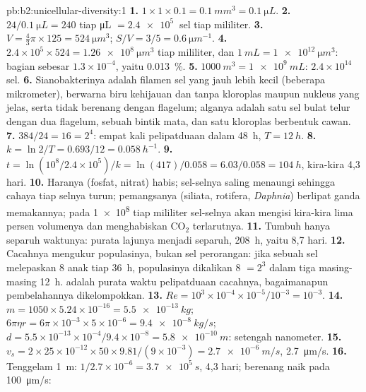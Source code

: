 \begin{solution}{pb:b2:unicellular-diversity:1}
\textbf{1.} $1\times 1\times 0.1 = \qty{0.1}{mm^3} = \qty{0.1}{\micro L}$.
\textbf{2.} $24/\qty{0.1}{\micro L} = 240$ tiap \unit{\micro L} $=
\qty{2.4e5}{}$ sel tiap mililiter.
\textbf{3.} $V = \tfrac{4}{3}\pi\times 125 = \qty{524}{\micro m^3}$;
$S/V = 3/5 = \qty{0.6}{\micro m^{-1}}$.
\textbf{4.} $2.4\times 10^5\times 524 = \qty{1.26e8}{\micro m^3}$ tiap
mililiter, dan $\qty{1}{mL} = \qty{1e12}{\micro m^3}$: bagian sebesar
$1.3\times 10^{-4}$, yaitu \qty{0.013}{\%}.
\textbf{5.} $\qty{1000}{m^3} = \qty{1e9}{mL}$: $2.4\times 10^{14}$
sel.
\textbf{6.} Sianobakterinya adalah filamen sel yang jauh lebih kecil
(beberapa mikrometer), berwarna biru kehijauan dan tanpa kloroplas
maupun nukleus yang jelas, serta tidak berenang dengan flagelum;
alganya adalah satu sel bulat telur dengan dua flagelum, sebuah bintik
mata, dan satu kloroplas berbentuk cawan.
\textbf{7.} $384/24 = 16 = 2^4$: empat kali pelipatduaan dalam
\qty{48}{h}, $T = \qty{12}{h}$.
\textbf{8.} $k = \ln 2/T = 0.693/12 = \qty{0.058}{h^{-1}}$.
\textbf{9.} $t = \ln(10^8/2.4\times 10^5)/k = \ln(417)/0.058 =
6.03/0.058 = \qty{104}{h}$, kira-kira 4,3 hari.
\textbf{10.} Haranya (fosfat, nitrat) habis; sel-selnya saling
menaungi sehingga cahaya tiap selnya turun; pemangsanya (siliata,
rotifera, \emph{Daphnia}) berlipat ganda memakannya; pada
\qty{1e8}{} tiap mililiter sel-selnya akan mengisi kira-kira lima
persen volumenya dan menghabiskan $\mathrm{CO_2}$ terlarutnya.
\textbf{11.} Tumbuh hanya separuh waktunya: purata lajunya menjadi
separuh, \qty{208}{h}, yaitu 8,7 hari.
\textbf{12.} Cacahnya mengukur populasinya, bukan sel perorangan: jika
sebuah sel melepaskan 8 anak tiap \qty{36}{h}, populasinya dikalikan
8 $= 2^3$ dalam tiga  masing-masing \qty{12}{h}.  adalah purata waktu pelipatduaan cacahnya, bagaimanapun
pembelahannya dikelompokkan.
\textbf{13.} $Re = 10^3\times 10^{-4}\times 10^{-5}/10^{-3} = 10^{-3}$.
\textbf{14.} $m = 1050\times 5.24\times 10^{-16} = \qty{5.5e-13}{kg}$;
$6\pi\eta r = 6\pi\times 10^{-3}\times 5\times 10^{-6} =
\qty{9.4e-8}{kg/s}$; $d = 5.5\times 10^{-13}\times 10^{-4}/9.4\times
10^{-8} = \qty{5.8e-10}{m}$: setengah nanometer.
\textbf{15.} $v_s = 2\times 25\times 10^{-12}\times 50\times
9.81/(9\times 10^{-3}) = \qty{2.7e-6}{m/s}$, \qty{2.7}{\micro m/s}.
\textbf{16.} Tenggelam \qty{1}{m}: $1/2.7\times 10^{-6} =
\qty{3.7e5}{s}$, 4,3 hari; berenang naik pada \qty{100}{\micro m/s}:

\end{solution}
